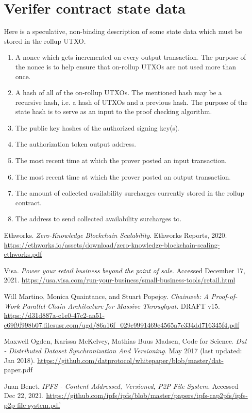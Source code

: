 \documentclass[12pt]{article}
\begin{document}
\section{Verifer contract state data}

Here is a speculative, non-binding description of some state data which must be stored in the rollup UTXO.

\begin{enumerate}
	\item A nonce which gets incremented on every output transaction. The purpose of the nonce is to help ensure that on-rollup UTXOs are not used more than once. 
	\item A hash of all of the on-rollup UTXOs. The mentioned hash may be a recursive hash, i.e. a hash of UTXOs and a previous hash. The purpose of the state hash is to serve as an input to the proof checking algorithm.
	\item The public key hashes of the authorized signing key(s).
	\item The authorization token output address.
	\item The most recent time at which the prover posted an input transaction.
	\item The most recent time at which the prover posted an output transaction.
	\item The amount of collected availability surcharges currently stored in the rollup contract.
	\item The address to send collected availability surcharges to.
\end{enumerate}




\clearpage


\begin{thebibliography}{3}


		Ethworks. \textit{Zero-Knowledge Blockchain Scalability}. Ethworks Reports, 2020. \url{https://ethworks.io/assets/download/zero-knowledge-blockchain-scaling-ethworks.pdf}

		Visa. \textit{Power your retail business beyond the point of sale.} Accessed December 17, 2021. \url{https://usa.visa.com/run-your-business/small-business-tools/retail.html}

		Will Martino, Monica Quaintance, and Stuart Popejoy. \textit{Chainweb: A Proof-of-Work Parallel-Chain Architecture for Massive Throughput.} DRAFT v15. \url{https://d31d887a-c1e0-47c2-aa51-c69f9f998b07.filesusr.com/ugd/86a16f_029c9991469e4565a7c334dd716345f4.pdf}

		Maxwell Ogden, Karissa McKelvey, Mathias Buus Madsen, Code for Science. \textit{Dat - Distributed Dataset Synchronization And Versioning.} May 2017 (last updated: Jan 2018). \url{https://github.com/datprotocol/whitepaper/blob/master/dat-paper.pdf}

		Juan Benet. \textit{IPFS - Content Addressed, Versioned, P2P File System.} Accessed Dec 22, 2021. \url{https://github.com/ipfs/ipfs/blob/master/papers/ipfs-cap2pfs/ipfs-p2p-file-system.pdf}


\end{thebibliography}
\end{document}
